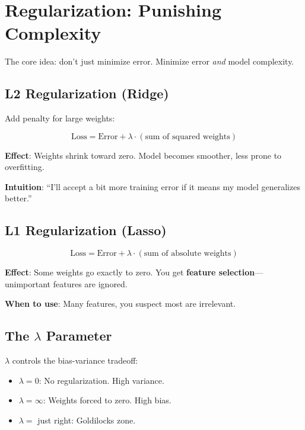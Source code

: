 \section{Regularization: Punishing Complexity}

The core idea: don't just minimize error. Minimize error \textit{and} model complexity.

\subsection{L2 Regularization (Ridge)}

Add penalty for large weights:

\begin{equation}
\text{Loss} = \text{Error} + \lambda \cdot (\text{sum of squared weights})
\end{equation}

\textbf{Effect}: Weights shrink toward zero. Model becomes smoother, less prone to overfitting.

\textbf{Intuition}: ``I'll accept a bit more training error if it means my model generalizes better.''

\subsection{L1 Regularization (Lasso)}

\begin{equation}
\text{Loss} = \text{Error} + \lambda \cdot (\text{sum of absolute weights})
\end{equation}

\textbf{Effect}: Some weights go exactly to zero. You get \textbf{feature selection}—unimportant features are ignored.

\textbf{When to use}: Many features, you suspect most are irrelevant.

\subsection{The $\lambda$ Parameter}

$\lambda$ controls the bias-variance tradeoff:
\begin{itemize}
    \item $\lambda = 0$: No regularization. High variance.
    \item $\lambda = \infty$: Weights forced to zero. High bias.
    \item $\lambda = $ just right: Goldilocks zone.
\end{itemize}

